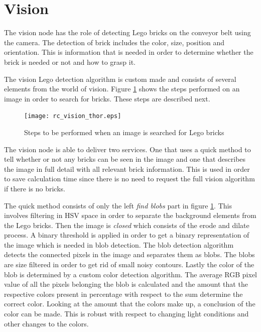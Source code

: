 \section{Vision}
\label{sec:rc_hmi_sec}
The vision node has the role of detecting Lego bricks on the conveyor belt using the camera. The detection of brick includes the color, size, position and orientation. This is information that is needed in order to determine whether the brick is needed or not and how to grasp it. 

The vision Lego detection algorithm is custom made and consists of several elements from the world of vision. Figure \ref{fig:rc_vision_steps_thor} shows the steps performed on an image in order to search for bricks. These steps are described next.\\
	
	\begin{figure}[H]
		\centering
	    \texttt{[image: rc\_vision\_thor.eps]}
	    \caption{Steps to be performed when an image is searched for Lego bricks}
		\label{fig:rc_vision_steps_thor}
	\end{figure}
	
The vision node is able to deliver two services. One that uses a quick method to tell whether or not any bricks can be seen in the image and one that describes the image in full detail with all relevant brick information. This is used in order to save calculation time since there is no need to request the full vision algorithm if there is no bricks.

The quick method consists of only the left \textit{find blobs} part in figure \ref{fig:rc_vision_steps_thor}. This involves filtering in HSV space in order to separate the background elements from the Lego bricks. Then the image is \textit{closed} which consists of the erode and dilate process. A binary threshold is applied in order to get a binary representation of the image which is needed in blob detection. The blob detection algorithm detects the connected pixels in the image and separates them as blobs. The blobs are size filtered in order to get rid of small noisy contours. Lastly the color of the blob is determined by a custom color detection algorithm. The average RGB pixel value of all the pixels belonging the blob is calculated and the amount that the respective colors present in percentage with respect to the sum determine the correct color. Looking at the amount that the colors make up, a conclusion of the color can be made. This is robust with respect to changing light conditions and other changes to the colors. 

